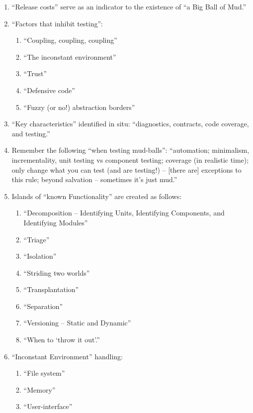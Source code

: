 \begin{enumerate}
\begin{enumerate}
\begin{enumerate}
		\item ``Release costs'' serve as an indicator to the existence of ``a Big Ball of Mud.''
		\item ``Factors that inhibit testing'': \vspace{-0.1cm}
			\begin{enumerate} \itemsep -1pt
			\item ``Coupling, coupling, coupling''
			\item ``The inconstant environment''
			\item ``Trust''
			\item ``Defensive code''
			\item ``Fuzzy (or no!) abstraction borders''
			\end{enumerate}
		\item ``Key characteristics'' identified in situ: ``diagnostics, contracts, code coverage, and testing.''
		\item Remember the following ``when testing mud-balls'': ``automation; minimalism, incrementality, unit testing vs component testing; coverage (in realistic time); only change what you can test (and are testing!) -- [there are] exceptions to this rule; beyond salvation -- sometimes it's just mud.''
		\item Islands of ``known Functionality'' are created as follows: \vspace{-0.1cm}
			\begin{enumerate} \itemsep -1pt
			\item ``Decomposition -- Identifying Units, Identifying Components, and Identifying Modules''
			\item ``Triage''
			\item ``Isolation''
			\item ``Striding two worlds''
			\item ``Transplantation''
			\item ``Separation''
			\item ``Versioning -- Static and Dynamic''
			\item ``When to `throw it out'.''
			\end{enumerate}
		\item ``Inconstant Environment'' handling: \vspace{-0.1cm}
			\begin{enumerate} \itemsep -1pt
			\item ``File system''
			\item ``Memory''
			\item ``User-interface''

\end{enumerate}
\end{enumerate}
\end{enumerate}
\end{enumerate}
